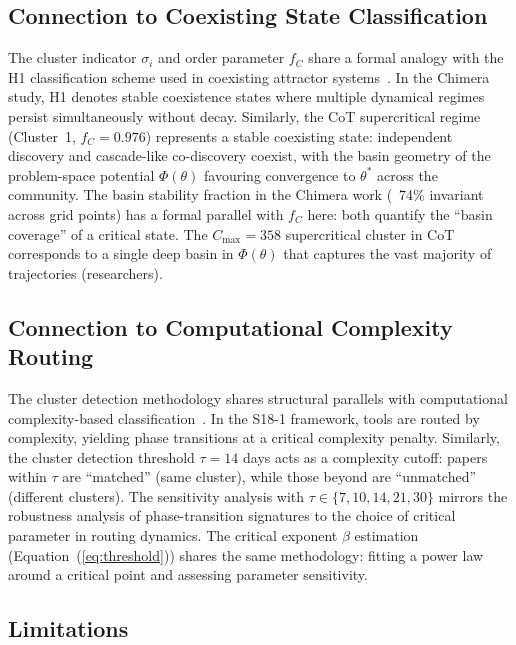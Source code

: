 \documentclass[12pt]{article}
\begin{document}
\subsection{Connection to Coexisting State Classification}

The cluster indicator $\sigma_i$ and order parameter $f_C$ share a formal analogy with the H1 classification scheme used in coexisting attractor systems~\cite{chimera-stable-attractors-2026}. In the Chimera study, H1 denotes stable coexistence states where multiple dynamical regimes persist simultaneously without decay. Similarly, the CoT supercritical regime (Cluster~1, $f_C=0.976$) represents a stable coexisting state: independent discovery and cascade-like co-discovery coexist, with the basin geometry of the problem-space potential $\Phi(\theta)$ favouring convergence to $\theta^*$ across the community. The basin stability fraction in the Chimera work (~74\% invariant across grid points) has a formal parallel with $f_C$ here: both quantify the ``basin coverage'' of a critical state. The $C_{\max}=358$ supercritical cluster in CoT corresponds to a single deep basin in $\Phi(\theta)$ that captures the vast majority of trajectories (researchers).

\subsection{Connection to Computational Complexity Routing}

The cluster detection methodology shares structural
parallels with computational complexity-based
classification~\cite{s18-1-2026}. In the S18-1 framework,
tools are routed by complexity, yielding phase transitions
at a critical complexity
penalty. Similarly, the cluster detection threshold
$\tau=14$ days acts as a complexity cutoff: papers within
$\tau$ are ``matched'' (same cluster), while those beyond
are ``unmatched'' (different clusters). The sensitivity
analysis with $\tau \in \{7, 10, 14, 21, 30\}$ mirrors
the robustness analysis of phase-transition signatures
to the choice of critical parameter in routing
dynamics. The critical exponent $\beta$ estimation
(Equation~(\ref{eq:threshold})) shares the same
methodology: fitting a power law around a critical point
and assessing parameter sensitivity.

\subsection{Limitations}
\end{document}
